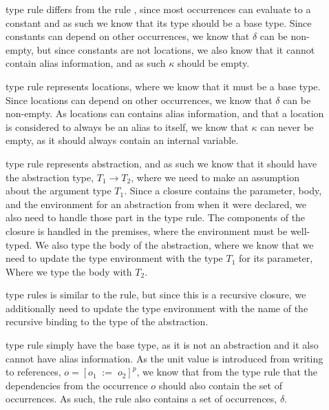 \documentclass[acmsmall,sigplan]{acmart}
\begin{document}
\begin{description}
	\item[] type rule differs from the rule , since most occurrences can evaluate to a constant and as such we know that its type should be a base type.
		Since constants can depend on other occurrences, we know that $\delta$ can be non-empty, but since constants are not locations, we also know that it cannot contain alias information, and as such $\kappa$ should be empty.

	\item[] type rule represents locations, where we know that it must be a base type.
		Since locations can depend on other occurrences, we know that $\delta$ can be non-empty.
		As locations can contains alias information, and that a location is considered to always be an alias to itself, we know that $\kappa$ can never be empty, as it should always contain an internal variable. 

	\item[] type rule represents abstraction, and as such we know that it should have the abstraction type, $T_1\rightarrow T_2$, where we need to make an assumption about the argument type $T_1$.
		Since a closure contains the parameter, body, and the environment for an abstraction from when it were declared, we also need to handle those part in the type rule.
		The components of the closure is handled in the premises, where the environment must be well-typed.
		We also type the body of the abstraction, where we know that we need to update the type environment with the type $T_1$ for its parameter, Where we type the body with $T_2$.

	\item[] type rules is similar to the  rule, but since this is a recursive closure, we additionally need to update the type environment with the name of the recursive binding to the type of the abstraction.

	\item[] type rule simply have the base type, as it is not an abstraction and it also cannot have alias information.
		As the unit value is introduced from writing to references, $o=[o_1\;:=\;o_2]^p$, we know that from the type rule  that the dependencies from the occurrence $o$ should also contain the set of occurrences.
		As such, the  rule also contains a set of occurrences, $\delta$.
\end{description}
\end{document}
